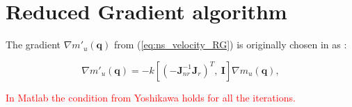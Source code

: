 








 





	
	






 



\section{Reduced Gradient algorithm}
\label{sec:1D2D}


The gradient $\nabla m'_u(\mathbf{q})$  from (\ref{eq:ns_velocity_RG}) is originally  chosen in \cite{reduced_gradient} as : 

\begin{equation}
 \nabla m'_u(\mathbf{q}) = - k \left[(-\mathbf{J}_{nr}^{-1} \mathbf{J}_r)^{T}, \   \mathbf{I} \right ] \nabla m_u(\mathbf{q})
 ,
\label{eq:RG_deLuca}
\end{equation}



\textcolor{red}{In Matlab the condition from Yoshikawa holds for all the iterations.  }\\



